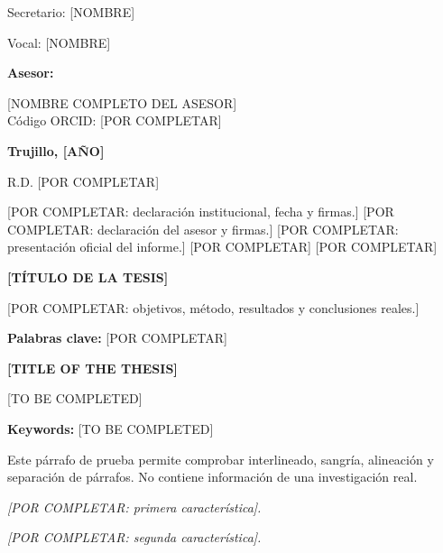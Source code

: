 \documentclass[12pt,a4paper,oneside]{report}
\begin{document}
\begin{titlepage}
\noindent Secretario: [NOMBRE]\par
\vspace{.10cm}
\noindent Vocal: [NOMBRE]\par
\vspace{.12cm}
\noindent\textbf{Asesor:}\par
\vspace{.10cm}
\begin{center}[NOMBRE COMPLETO DEL ASESOR]\\[3pt]
Código ORCID: [POR COMPLETAR]\end{center}
\vfill
\begin{center}\textbf{Trujillo, [AÑO]}\end{center}
\vspace{.10cm}
\noindent R.D. [POR COMPLETAR]
\end{titlepage}
\hypersetup{pageanchor=true}
\hypersetup{pageanchor=true} %
[POR COMPLETAR: declaración institucional, fecha y firmas.]
[POR COMPLETAR: declaración del asesor y firmas.]
[POR COMPLETAR: presentación oficial del informe.]
[POR COMPLETAR]
[POR COMPLETAR]
\begin{center}\textbf{[TÍTULO DE LA TESIS]}\end{center}
[POR COMPLETAR: objetivos, método, resultados y conclusiones reales.]\par
\noindent\textbf{Palabras clave:} [POR COMPLETAR]
\begin{center}\textbf{[TITLE OF THE THESIS]}\end{center}
[TO BE COMPLETED]\par
\noindent\textbf{Keywords:} [TO BE COMPLETED]
\clearpage\tableofcontents
\clearpage\listoftables
\clearpage\listoffigures
\clearpage{}
Este párrafo de prueba permite comprobar interlineado, sangría, alineación y separación de párrafos. No contiene información de una investigación real.
\begin{listaTrasTitulo}
\item \textit{[POR COMPLETAR: primera característica].}
\item \textit{[POR COMPLETAR: segunda característica].}
\end{listaTrasTitulo}
\end{document}
